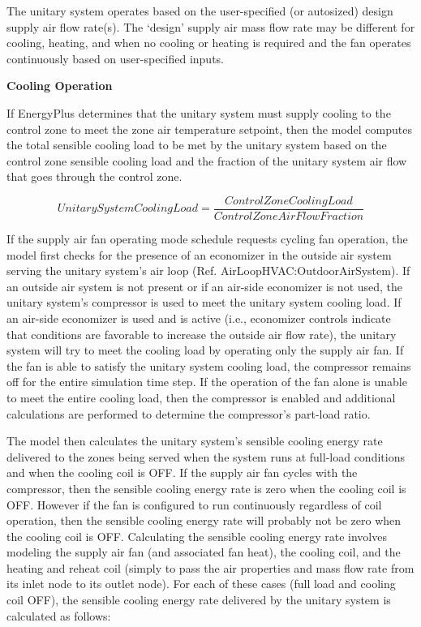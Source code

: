 The unitary system operates based on the user-specified (or autosized) design supply air flow rate(s). The `design' supply air mass flow rate may be different for cooling, heating, and when no cooling or heating is required and the fan operates continuously based on user-specified inputs.

\textbf{Cooling Operation}

If EnergyPlus determines that the unitary system must supply cooling to the control zone to meet the zone air temperature setpoint, then the model computes the total sensible cooling load to be met by the unitary system based on the control zone sensible cooling load and the fraction of the unitary system air flow that goes through the control zone.

\begin{equation}
UnitarySystemCoolingLoad = \frac{{ControlZoneCoolingLoad}}{{ControlZoneAirFlowFraction}}
\label{eq:UnitarySystemCoolingLoad}
\end{equation}

If the supply air fan operating mode schedule requests cycling fan operation, the model first checks for the presence of an economizer in the outside air system serving the unitary system's air loop (Ref. AirLoopHVAC:OutdoorAirSystem). If an outside air system is not present or if an air-side economizer is not used, the unitary system's compressor is used to meet the unitary system cooling load. If an air-side economizer is used and is active (i.e., economizer controls indicate that conditions are favorable to increase the outside air flow rate), the unitary system will try to meet the cooling load by operating only the supply air fan. If the fan is able to satisfy the unitary system cooling load, the compressor remains off for the entire simulation time step. If the operation of the fan alone is unable to meet the entire cooling load, then the compressor is enabled and additional calculations are performed to determine the compressor's part-load ratio.

The model then calculates the unitary system's sensible cooling energy rate delivered to the zones being served when the system runs at full-load conditions and when the cooling coil is OFF. If the supply air fan cycles with the compressor, then the sensible cooling energy rate is zero when the cooling coil is OFF. However if the fan is configured to run continuously regardless of coil operation, then the sensible cooling energy rate will probably not be zero when the cooling coil is OFF. Calculating the sensible cooling energy rate involves modeling the supply air fan (and associated fan heat), the cooling coil, and the heating and reheat coil (simply to pass the air properties and mass flow rate from its inlet node to its outlet node). For each of these cases (full load and cooling coil OFF), the sensible cooling energy rate delivered by the unitary system is calculated as follows:

